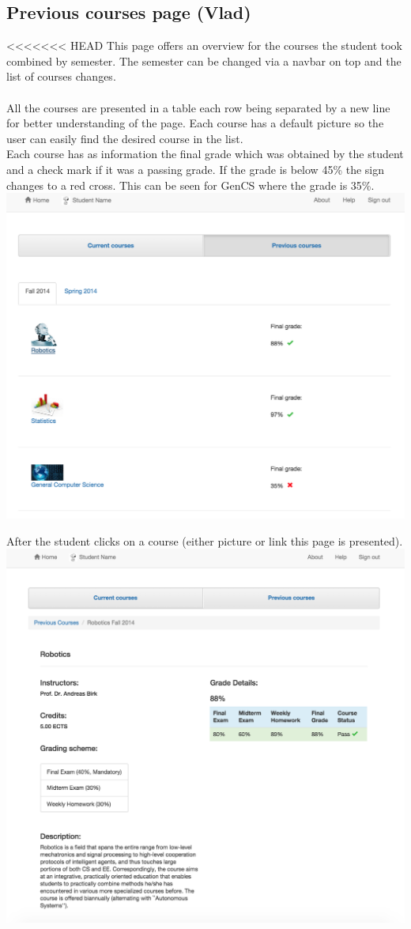 \subsection{Previous courses page (Vlad)}

<<<<<<< HEAD
This page offers an overview for the courses the student took combined by semester. The semester can be changed via a navbar on top and the list of courses changes.\\\\
All the courses are presented in a table each row being separated by a new line for better understanding of the page. Each course has a default picture so the user can easily find the desired course in the list. \\
Each course has as information the final grade which was obtained by the student and a check mark if it was a passing grade. If the grade is below 45\% the sign changes to a red cross. This can be seen for GenCS where the grade is 35\%.\\
\includegraphics[width=.85\textwidth]{screenshots/PrevoiusCoursesOverview.png}

After the student clicks on a course (either picture or link this page is presented).\\

\includegraphics[width=.85\textwidth]{screenshots/PreviousCourseDetail.png}

